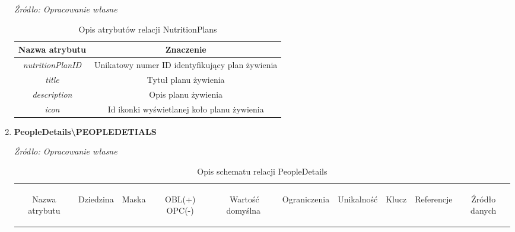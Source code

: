 \documentclass[12pt,twoside]{report}
\begin{document}
\begin{enumerate}[start=10,label={\bfseries REL\textbackslash\arabic*}]
	\begin{table}[H]
		\caption{Opis atrybutów relacji NutritionPlans}
		\textit{Źródło: Opracowanie własne}
		\label{NutritionPlansAttributeDescription}
		\centering
		\begin{tabular}{|c|c|}
			\hline
			Nazwa atrybutu & Znaczenie \\
			\hline			
			\textit{nutritionPlanID}& Unikatowy numer ID identyfikujący plan żywienia\\	
			\hline			
			\textit{title}&Tytuł planu żywienia\\	
			\hline			
			\textit{description}&Opis planu żywienia\\	
			\hline			
			\textit{icon}&Id ikonki wyświetlanej koło planu żywienia\\	
			\hline
		\end{tabular}
	\end{table}
	\item \textbf{PeopleDetails\textbackslash PEOPLEDETIALS}
	 \begin{table}[H]
		\caption{Opis schematu relacji PeopleDetails}
		\textit{Źródło: Opracowanie własne}
		\label{PeopleDetailsRelationSchema}
		\centering
		\begin{tabular}{|c|c|c|c|c|c|c|c|c|c|}
			\hline
			\begin{sideways}Nazwa atrybutu\end{sideways}& 
			\begin{sideways}Dziedzina \end{sideways}& 
			\begin{sideways}Maska \end{sideways}& 
			\begin{sideways}OBL(+) OPC(-)\end{sideways} & 
			\begin{sideways}Wartość domyślna$\ $\end{sideways}& 
			\begin{sideways}Ograniczenia\end{sideways} &
			\begin{sideways}Unikalność \end{sideways}& 
			\begin{sideways}Klucz \end{sideways}& 
			\begin{sideways}Referencje \end{sideways}&
			\begin{sideways}Źródło danych\end{sideways}\\

\end{tabular}
\end{table}
\end{enumerate}
\end{document}
